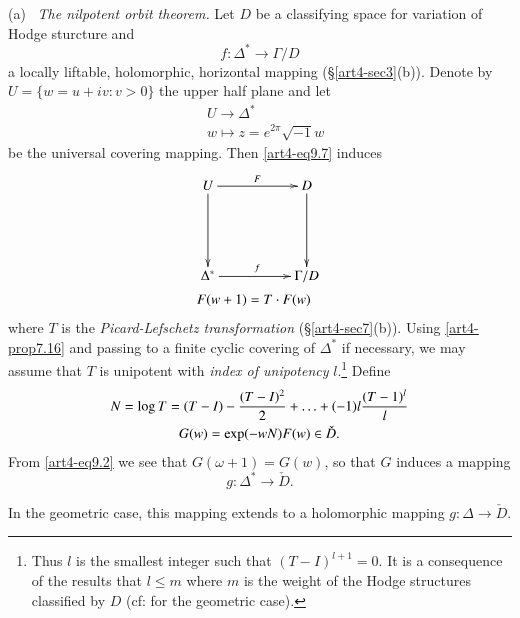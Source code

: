 \noindent
(a)~ \textit{The nilpotent orbit theorem.} Let $D$ be a classifying space for variation of Hodge sturcture and
\setcounter{equation}{0}
\begin{equation}
f : \Delta^\ast \to\Gamma / D\label{art4-eq9.1}
\end{equation}
a locally liftable, holomorphic, horizontal mapping (\S \ref{art4-sec3}(b)). Denote by $U = \{w = u + i v : v > 0\}$ the upper half plane and let
\begin{align*}
&U \longrightarrow \Delta^\ast\\
&w \longmapsto z = e^{2\pi} \sqrt{-1} w
\end{align*}
be the universal covering mapping. Then \eqref{art4-eq9.7} induces
\begin{align}
& 
\vcenter{
\xymatrix@=1.8cm{
U \ar[r]^F \ar[d] & D \ar[d]\\
\Delta^\ast \ar[r]^f & \Gamma / D }}\label{art4-eq9.2}\\
& F (w + 1) = T \cdot F (w) \notag
\end{align}\pageoriginale
where $T$ is the \textit{Picard-Lefschetz transformation} (\cf \S \ref{art4-sec7}(b)). Using \eqref{art4-prop7.16} and passing to a finite cyclic covering of $\Delta^\ast$ if necessary, we may assume that $T$ is unipotent with \textit{index of unipotency} $l$.\footnote[38]{Thus $l$ is the smallest integer such that $(T - I)^{l+1} =0$. It is a consequence of the results \cite{art4-key41} that $l \leqslant m$ where $m$ is the weight of the Hodge structures classified by $D$ (cf: \cite{art4-key35} for the geometric case).} Define
\begin{gather}  
N = \log T = (T - I) - \frac{(T - I)^2}{2} + \ldots + (-1)l\frac{(T-1)^l}{l}\notag\\
G (w) = \exp (-w N) F (w) \in \check{D}. \label{art4-eq9.3}
\end{gather}
From \eqref{art4-eq9.2} we see that $G (\omega+1) = G (w)$, so that $G$ induces a mapping
$$
g : \Delta^\ast \to \check{D}.
$$

\setcounter{proposition}{3}
\begin{proposition}\label{art4-eq9.4}
In the geometric case, this mapping extends to a holomorphic mapping $g : \Delta \to \check{D}$.
\end{proposition}

